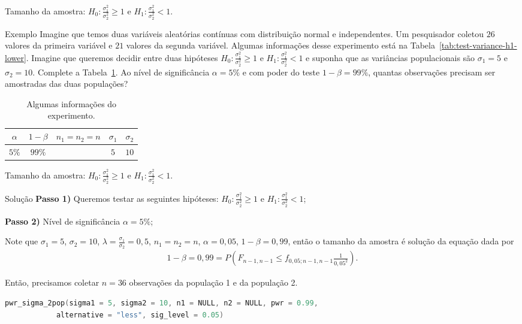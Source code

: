 \documentclass[9pt]{beamer}
\begin{document}
\begin{frame}{Tamanho da amostra: $H_0:\frac{\sigma_1^2}{\sigma_2^2} \geq 1$ e $H_1:\frac{\sigma_1^2}{\sigma_2^2} < 1$.}

\begin{block}{Exemplo}
	Imagine que temos duas variáveis aleatórias contínuas com distribuição normal e independentes. Um pesquisador coletou $26$ valores da primeira variável e $21$ valores da segunda variável. Algumas informações desse experimento está na Tabela~\ref{tab:test-variance-h1-lower}. Imagine que queremos decidir entre duas hipóteses $H_0: \frac{\sigma_1^2}{\sigma_2^2} \geq 1$ e $H_1: \frac{\sigma_1^2}{\sigma_2^2} < 1$ e suponha que as variâncias populacionais são $\sigma_1 = 5$  e $\sigma_2 = 10$. Complete a Tabela~\ref{tab:test-variance-h1-lower-sample-size}. Ao nível de significância $\alpha=5\%$ e com poder do teste $1-\beta=99\%$, quantas observações precisam ser amostradas das duas populações?
	\begin{table}[htbp]
		\centering
		\begin{tabular}{c|c|c|c|c}
			\toprule[0.05cm]
			$\alpha$ & $1-\beta$ & $n_1=n_2 = n$ & $\sigma_1$ & $\sigma_2$\\
			\midrule[0.025cm]
			$5\%$ & $99\%$ &  & $5$ & $10$ \\
			\bottomrule[0.05cm]
		\end{tabular}
		\caption{Algumas informações do experimento.}
		\label{tab:test-variance-h1-lower-sample-size}
	\end{table}
\end{block}
\end{frame}

\begin{frame}[fragile]{Tamanho da amostra: $H_0:\frac{\sigma_1^2}{\sigma_2^2} \geq 1$ e $H_1:\frac{\sigma_1^2}{\sigma_2^2} < 1$.}

\begin{block}{Solução}
	\textbf{Passo 1)} Queremos testar as seguintes hipóteses: $H_0: \frac{\sigma_1^2}{\sigma_2^2} \geq 1$ e $H_1: \frac{\sigma_1^2}{\sigma_2^2} < 1$;

	\textbf{Passo 2)} Nível de significância $\alpha=5\%$;
	
	Note que $\sigma_1=5$, $\sigma_2=10$, $\lambda =  \frac{\sigma_1}{\sigma_2} = 0,5$, $n_1 = n_2 = n$, $\alpha=0,05$, $1-\beta=0,99$, então o tamanho da amostra é solução da equação dada por
	\begin{align*}
	1-\beta =0,99 = P\left(F_{n-1, n-1} \leq f_{0,05;n-1, n-1}  \frac{1}{0,05^2}\right).
	\end{align*}	
	
	Então, precisamos coletar $n=36$ observações da população 1 e da população 2.
\end{block}

\begin{lstlisting}[language = C, caption = Código no R.]
pwr_sigma_2pop(sigma1 = 5, sigma2 = 10, n1 = NULL, n2 = NULL, pwr = 0.99,
			alternative = "less", sig_level = 0.05)
\end{lstlisting}

\end{frame}
\end{document}
